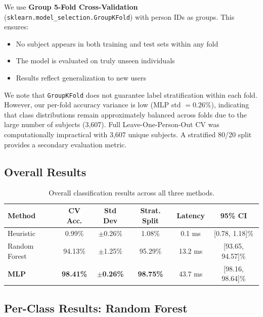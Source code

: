 \documentclass[11pt,a4paper]{article}
\begin{document}
We use \textbf{Group 5-Fold Cross-Validation} (\texttt{sklearn.model\_selection.GroupKFold}) with person IDs as groups. This ensures:
\begin{itemize}
    \item No subject appears in both training and test sets within any fold
    \item The model is evaluated on truly unseen individuals
    \item Results reflect generalization to new users
\end{itemize}

We note that \texttt{GroupKFold} does not guarantee label stratification within each fold. However, our per-fold accuracy variance is low (MLP std $= 0.26\%$), indicating that class distributions remain approximately balanced across folds due to the large number of subjects (3,607). Full Leave-One-Person-Out CV was computationally impractical with 3,607 unique subjects. A stratified 80/20 split provides a secondary evaluation metric.

\subsection{Overall Results}

\begin{table}[H]
\centering
\caption{Overall classification results across all three methods.}
\label{tab:results}
\begin{tabular}{@{}lccccc@{}}
\toprule
\textbf{Method} & \textbf{CV Acc.} & \textbf{Std Dev} & \textbf{Strat. Split} & \textbf{Latency} & \textbf{95\% CI} \\
\midrule
Heuristic & 0.99\% & $\pm$0.26\% & 1.08\% & 0.1 ms & [0.78, 1.18]\% \\
Random Forest & 94.13\% & $\pm$1.25\% & 95.29\% & 13.2 ms & [93.65, 94.57]\% \\
\textbf{MLP} & \textbf{98.41\%} & $\pm$\textbf{0.26\%} & \textbf{98.75\%} & 43.7 ms & [98.16, 98.64]\% \\
\bottomrule
\end{tabular}
\end{table}

\subsection{Per-Class Results: Random Forest}
\end{document}
